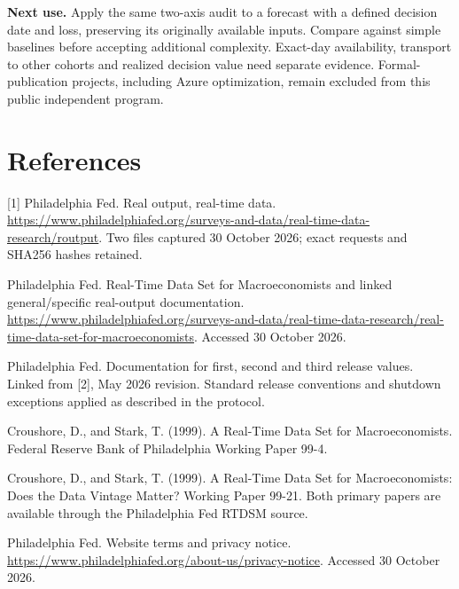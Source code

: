 \documentclass[10pt,letterpaper]{article}
\begin{document}
\textbf{Next use.} Apply the same two-axis audit to a forecast with a defined decision date and loss, preserving its originally available inputs. Compare against simple baselines before accepting additional complexity. Exact-day availability, transport to other cohorts and realized decision value need separate evidence. Formal-publication projects, including Azure optimization, remain excluded from this public independent program.

\section*{References}
{\footnotesize
[1] Philadelphia Fed. Real output, real-time data. \url{https://www.philadelphiafed.org/surveys-and-data/real-time-data-research/routput}. Two files captured 30 October 2026; exact requests and SHA256 hashes retained.\par
[2] Philadelphia Fed. Real-Time Data Set for Macroeconomists and linked general/specific real-output documentation. \url{https://www.philadelphiafed.org/surveys-and-data/real-time-data-research/real-time-data-set-for-macroeconomists}. Accessed 30 October 2026.\par
[3] Philadelphia Fed. Documentation for first, second and third release values. Linked from [2], May 2026 revision. Standard release conventions and shutdown exceptions applied as described in the protocol.\par
[4] Croushore, D., and Stark, T. (1999). A Real-Time Data Set for Macroeconomists. Federal Reserve Bank of Philadelphia Working Paper 99-4.\par
[5] Croushore, D., and Stark, T. (1999). A Real-Time Data Set for Macroeconomists: Does the Data Vintage Matter? Working Paper 99-21. Both primary papers are available through the Philadelphia Fed RTDSM source.\par
[6] Philadelphia Fed. Website terms and privacy notice. \url{https://www.philadelphiafed.org/about-us/privacy-notice}. Accessed 30 October 2026.}
\end{document}
